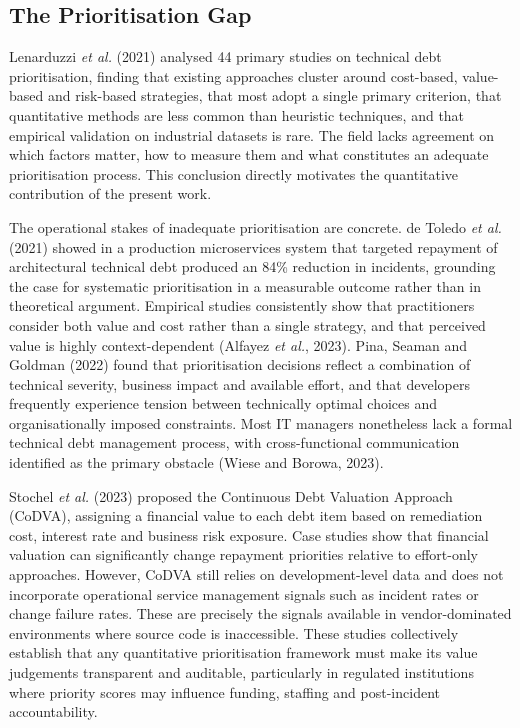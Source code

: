 \documentclass[
  12pt,
  letterpaper,
  12pt,
  oneside,
  english,
  onehalfspacing,
  headsepline]{MastersDoctoralThesis}
\begin{document}
\subsection{The Prioritisation Gap}\label{the-prioritisation-gap}

Lenarduzzi \emph{et al.} (2021) analysed 44 primary studies on technical
debt prioritisation, finding that existing approaches cluster around
cost-based, value-based and risk-based strategies, that most adopt a
single primary criterion, that quantitative methods are less common than
heuristic techniques, and that empirical validation on industrial
datasets is rare. The field lacks agreement on which factors matter, how
to measure them and what constitutes an adequate prioritisation process.
This conclusion directly motivates the quantitative contribution of the
present work.

The operational stakes of inadequate prioritisation are concrete. de
Toledo \emph{et al.} (2021) showed in a production microservices system
that targeted repayment of architectural technical debt produced an 84\%
reduction in incidents, grounding the case for systematic prioritisation
in a measurable outcome rather than in theoretical argument. Empirical
studies consistently show that practitioners consider both value and
cost rather than a single strategy, and that perceived value is highly
context-dependent (Alfayez \emph{et al.}, 2023). Pina, Seaman and
Goldman (2022) found that prioritisation decisions reflect a combination
of technical severity, business impact and available effort, and that
developers frequently experience tension between technically optimal
choices and organisationally imposed constraints. Most IT managers
nonetheless lack a formal technical debt management process, with
cross-functional communication identified as the primary obstacle (Wiese
and Borowa, 2023).

Stochel \emph{et al.} (2023) proposed the Continuous Debt Valuation
Approach (CoDVA), assigning a financial value to each debt item based on
remediation cost, interest rate and business risk exposure. Case studies
show that financial valuation can significantly change repayment
priorities relative to effort-only approaches. However, CoDVA still
relies on development-level data and does not incorporate operational
service management signals such as incident rates or change failure
rates. These are precisely the signals available in vendor-dominated
environments where source code is inaccessible. These studies
collectively establish that any quantitative prioritisation framework
must make its value judgements transparent and auditable, particularly
in regulated institutions where priority scores may influence funding,
staffing and post-incident accountability.
\end{document}
